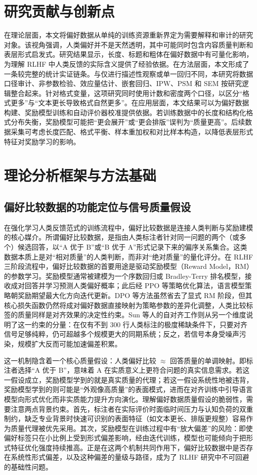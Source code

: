 \documentclass[9pt,a4paper,fontset=windows]{ctexart}
\theoremstyle{definition}
\numberwithin{equation}{section}
\begin{document}
\section{研究贡献与创新点}
在理论层面，本文将偏好数据从单纯的训练资源重新界定为需要解释和审计的研究对象。该视角强调，人类偏好并不是天然透明，其中可能同时包含内容质量判断和表层形式启发式。研究结果显示，长度、标题和粗体在偏好数据中有可量化影响，为理解 RLHF 中人类反馈的实际含义提供了经验依据。在方法层面，本文形成了一条较完整的统计实证链条。与仅进行描述性观察或单一回归不同，本研究将数据口径审计、非参数检验、效应量估计、嵌套回归、IPW、PSM 和 SEM 按研究逻辑整合起来。针对格式变量，这项研究同时使用计数和密度两个口径，以区分“格式更多”与“文本更长导致格式自然更多”。在应用层面，本文结果可以为偏好数据构建、奖励模型训练和自动评价器校准提供依据。若训练数据中的长度和结构化格式分布失衡，奖励模型可能把“更会展开”或“更会排版”误判为“质量更高”。后续数据采集可考虑长度匹配、格式平衡、样本重加权和对比样本构造，以降低表层形式特征对奖励学习的影响。

\section{理论分析框架与方法基础}

\subsection{偏好比较数据的功能定位与信号质量假设}
在强化学习人类反馈范式的训练流程中，偏好比较数据是连接人类判断与奖励建模的核心媒介。所谓偏好比较数据，是指由人类标注者针对同一问题的两个（或多个）候选回答，以“A 优于 B”或“B 优于 A”形式记录下来的偏序关系集合。这类数据本质上是对“相对质量”的人类判断，而非对“绝对质量”的量化评分。在 RLHF 三阶段流程中，偏好比较数据的首要用途是驱动奖励模型（Reward Model，RM）的参数学习。奖励模型通常被建模为一个序数回归或 Bradley-Terry 排名模型，接收成对回答并学习预测人类偏好概率；此后经 PPO 等策略优化算法，语言模型策略朝奖励期望最大化方向迭代更新。DPO 等方法虽然省去了显式 RM 阶段，但其核心损失函数仍然将成对偏好数据直接映射为策略参数的差异化调整，人类比较标签的质量同样是对齐效果的决定性约束。Sun 等人的自对齐工作则从另一个维度说明了这一约束的分量：在仅有不到 300 行人类标注的极度稀缺条件下，只要对齐信号足够纯粹，仍可超越多个规模更大的同期系统；反之，若信号本身受噪声污染，规模扩大反而可能加速偏差积累。

这一机制隐含着一个核心质量假设：人类偏好比较 \(\approx\) 回答质量的单调映射。即标注者选择“A 优于 B”，意味着 A 在实质意义上更符合问题的真实信息需求。若这一假设成立，奖励模型学到的就是真实质量的代理；若这一假设系统性地被违背，奖励模型学到的则可能是“外观像高质量”的表面模式，进而在对齐训练中引导语言模型向形式优化而非实质能力提升方向演化。理解偏好数据质量假设的脆弱性，需要注意两点背景约束。首先，标注者在实际评价时面临时间压力与认知负荷的双重制约，缺乏专业背景时快速可识别的表面特征（如文本更长、排版更规整）容易作为质量代理被优先采用。其次，奖励模型在训练过程中有“放大偏差”的风险：即使偏好标签只在小比例上受到形式偏差影响，经由迭代训练，模型也可能倾向于把形式特征优化强度持续推高。正是在这两个机制共同作用下，偏好比较数据中是否存在系统性形式偏差，以及这种偏差的量级与路径，成为了 RLHF 研究中不可回避的基础性问题。
\end{document}
